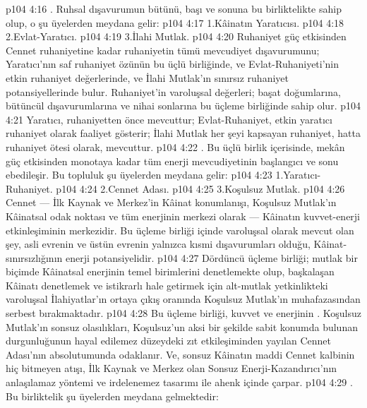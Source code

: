 \vs p104 4:16 . Ruhsal dışavurumun bütünü, başı ve sonuna bu birliktelikte sahip olup, o şu üyelerden meydana gelir:
\vs p104 4:17 1.\bibnobreakspace Kâinatın Yaratıcısı.
\vs p104 4:18 2.\bibnobreakspace Evlat\hyp{}Yaratıcı.
\vs p104 4:19 3.\bibnobreakspace İlahi Mutlak.
\vs p104 4:20 Ruhaniyet güç etkisinden Cennet ruhaniyetine kadar ruhaniyetin tümü mevcudiyet dışavurumunu; Yaratıcı’nın saf ruhaniyet özünün bu üçlü birliğinde, ve Evlat\hyp{}Ruhaniyeti’nin etkin ruhaniyet değerlerinde, ve İlahi Mutlak’ın sınırsız ruhaniyet potansiyellerinde bulur. Ruhaniyet’in varoluşsal değerleri; başat doğumlarına, bütüncül dışavurumlarına ve nihai sonlarına bu üçleme birliğinde sahip olur.
\vs p104 4:21 Yaratıcı, ruhaniyetten önce mevcuttur; Evlat\hyp{}Ruhaniyet, etkin yaratıcı ruhaniyet olarak faaliyet gösterir; İlahi Mutlak her şeyi kapsayan ruhaniyet, hatta ruhaniyet ötesi olarak, mevcuttur.
\vs p104 4:22 . Bu üçlü birlik içerisinde, mekân güç etkisinden monotaya kadar tüm enerji mevcudiyetinin başlangıcı ve sonu ebedileşir. Bu topluluk şu üyelerden meydana gelir:
\vs p104 4:23 1.\bibnobreakspace Yaratıcı\hyp{}Ruhaniyet.
\vs p104 4:24 2.\bibnobreakspace Cennet Adası.
\vs p104 4:25 3.\bibnobreakspace Koşulsuz Mutlak.
\vs p104 4:26 Cennet --- İlk Kaynak ve Merkez’in Kâinat konumlanışı, Koşulsuz Mutlak’ın Kâinatsal odak noktası ve tüm enerjinin merkezi olarak --- Kâinatın kuvvet\hyp{}enerji etkinleşiminin merkezidir. Bu üçleme birliği içinde varoluşsal olarak mevcut olan şey, asli evrenin ve üstün evrenin yalnızca kısmi dışavurumları olduğu, Kâinat\hyp{}sınırsızlığının enerji potansiyelidir.
\vs p104 4:27 Dördüncü üçleme birliği; mutlak bir biçimde Kâinatsal enerjinin temel birimlerini denetlemekte olup, başkalaşan Kâinatı denetlemek ve istikrarlı hale getirmek için alt\hyp{}mutlak yetkinlikteki varoluşsal İlahiyatlar’ın ortaya çıkış oranında Koşulsuz Mutlak’ın muhafazasından serbest bırakmaktadır.
\vs p104 4:28 Bu üçleme birliği, kuvvet ve enerjinin . Koşulsuz Mutlak’ın sonsuz olasılıkları, Koşulsuz’un aksi bir şekilde sabit konumda bulunan durgunluğunun hayal edilemez düzeydeki zıt etkileşiminden yayılan Cennet Adası’nın absolutumunda odaklanır. Ve, sonsuz Kâinatın maddi Cennet kalbinin hiç bitmeyen atışı, İlk Kaynak ve Merkez olan Sonsuz Enerji\hyp{}Kazandırıcı’nın anlaşılamaz yöntemi ve irdelenemez tasarımı ile ahenk içinde çarpar.
\vs p104 4:29 . Bu birliktelik şu üyelerden meydana gelmektedir:
